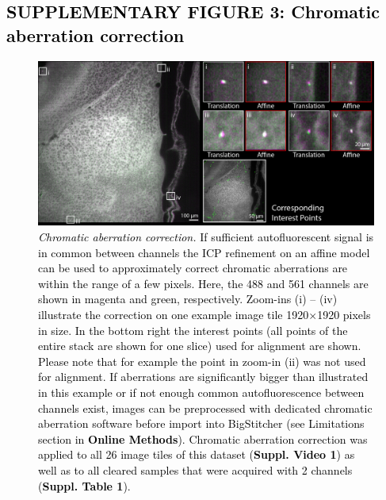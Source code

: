 \documentclass[]{spie}  %
\def\red{\textcolor{black}}
\begin{document}
\pagebreak

\subsection*{\red{SUPPLEMENTARY FIGURE 3: Chromatic aberration correction}}
\vspace{1mm}
\begin{figure}[h!]
\includegraphics[width=\textwidth]{fig-chr_aberrations.jpg}
\vspace{-2.0mm}
\caption{\hspace{-0.5mm} \red{\emph{Chromatic aberration correction.} If sufficient autofluorescent signal is in common between channels the ICP refinement on an affine model can be used to approximately correct chromatic aberrations are within the range of a few pixels. Here, the 488 and 561 channels are shown in magenta and green, respectively. Zoom-ins (i) -- (iv) illustrate the correction on one example image tile 1920$\times$1920 pixels in size. In the bottom right the interest points (all points of the entire stack are shown for one slice) used for alignment are shown. Please note that for example the point in zoom-in (ii) was not used for alignment. If aberrations are significantly bigger than illustrated in this example or if not enough common autofluorescence between channels exist, images can be preprocessed with dedicated chromatic aberration software before import into BigStitcher (see Limitations section in \textbf{Online Methods}). Chromatic aberration correction was applied to all 26 image tiles of this dataset (\textbf{Suppl. Video 1}) as well as to all cleared samples that were acquired with 2 channels (\textbf{Suppl. Table 1}).
}}
\label{fig:sup-chromatic}
\end{figure}

\pagebreak
\end{document}
